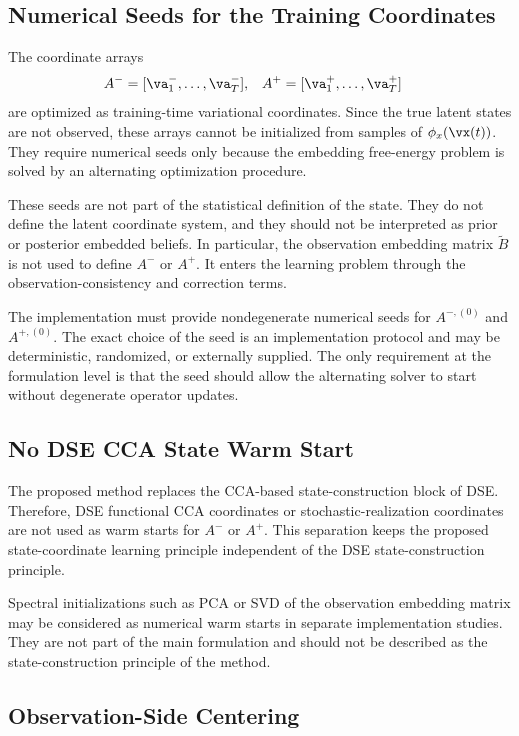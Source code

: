 \documentclass[twoside,11pt]{article}
\begin{document}
\subsection{Numerical Seeds for the Training Coordinates}

The coordinate arrays
\begin{align}
A^-
&=
[\va_1^-,\dots,\va_T^-],
&
A^+
&=
[\va_1^+,\dots,\va_T^+]
\end{align}
are optimized as training-time variational coordinates. Since the true
latent states are not observed, these arrays cannot be initialized from
samples of $\phi_x(\vx(t))$. They require numerical seeds only because
the embedding free-energy problem is solved by an alternating
optimization procedure.

These seeds are not part of the statistical definition of the state.
They do not define the latent coordinate system, and they should not be
interpreted as prior or posterior embedded beliefs. In particular, the
observation embedding matrix $\tilde B$ is not used to define
$A^-$ or $A^+$. It enters the learning problem through the
observation-consistency and correction terms.

The implementation must provide nondegenerate numerical seeds for
$A^{-,(0)}$ and $A^{+,(0)}$. The exact choice of the seed is an
implementation protocol and may be deterministic, randomized, or
externally supplied. The only requirement at the formulation level is
that the seed should allow the alternating solver to start without
degenerate operator updates.

\subsection{No DSE CCA State Warm Start}

The proposed method replaces the CCA-based state-construction block of
DSE. Therefore, DSE functional CCA coordinates or stochastic-realization
coordinates are not used as warm starts for $A^-$ or $A^+$. This
separation keeps the proposed state-coordinate learning principle
independent of the DSE state-construction principle.

Spectral initializations such as PCA or SVD of the observation embedding
matrix may be considered as numerical warm starts in separate
implementation studies. They are not part of the main formulation and
should not be described as the state-construction principle of the
method.

\subsection{Observation-Side Centering}
\end{document}
